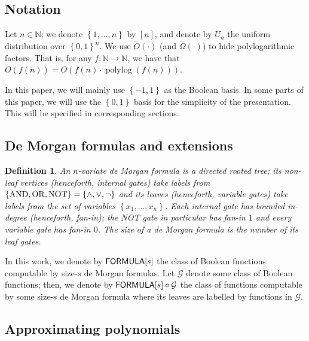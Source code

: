\documentclass[10pt,a4paper]{article}
\newtheorem{definition}[theorem]{Definition}
\newcommand{\polylog}{\operatorname{polylog}}
\newcommand{\bool}{\left\{0,1\right\}}
\newcommand{\boolpm}{\left\{-1,1\right\}}
\newcommand{\FORMULA}{{\sf FORMULA}}
\newcommand{\uniform}{U}
\newcommand{\cprn}[1]{\!\left(#1\right)}
\newcommand{\brkts}[1]{\left\{#1\right\}}
\begin{document}
	\subsection{Notation}
	
	Let $n\in\mathbb{N}$; we denote $\brkts{1,\dots,n}$ by $[n]$, and denote by $\uniform_n$ the uniform distribution over $\bool^n$. We use $\widetilde{O}(\cdot)$ (and $\widetilde{\Omega}(\cdot)$)  to hide polylogarithmic factors. That is, for any $f\colon\mathbb{N}\to\mathbb{N}$, we have that $\widetilde{O}(f(n))=O\cprn{f(n)\cdot\polylog\cprn{f(n)}}$.
	
	In this paper, we will mainly use $\boolpm$ as the Boolean basis. In some parts of this paper, we will use the $\bool$ basis for the simplicity of the presentation. This will be specified in corresponding sections.
	
	\subsection{De Morgan formulas and extensions}
	
	\begin{definition}
	    An $n$-variate \emph{de Morgan formula} is a directed rooted tree; its non-leaf vertices (henceforth, \emph{internal gates}) take labels from $\brkts{{\rm AND},{\rm OR},{\rm NOT}}=\brkts{\land,\lor,\neg}$ and its leaves (henceforth, \emph{variable gates}) take labels from the set of variables $\brkts{x_1,\dots,x_n}$. Each internal gate has bounded in-degree (henceforth, \emph{fan-in}); the {\rm NOT} gate in particular has fan-in $1$ and every variable gate has fan-in $0$. The \emph{size} of a de Morgan formula is the number of its leaf gates.
%
	\end{definition}
	
	In this work, we denote by $\FORMULA[s]$ the class of Boolean functions computable by size-$s$ de Morgan formulas. Let $\mathcal{G}$ denote some class of Boolean functions; then, we denote by $\FORMULA[s]\circ\mathcal{G}$ the class of functions computable by some size-$s$ de Morgan formula where its leaves are labelled by functions in $\mathcal{G}$.
	
%
	
%
%
%
%
%
%
%
%
%
    
%
%
%
%
%
    
    \subsection{Approximating polynomials}
    
\end{document}
